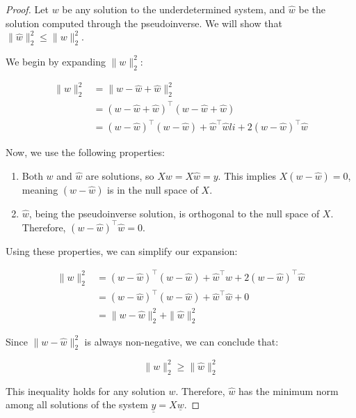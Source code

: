 \begin{proof}
Let $w$ be any solution to the underdetermined system, and $\hat{w}$ be the solution computed through the pseudoinverse. We will show that $\|\hat{w}\|_2^2 \leq \|w\|_2^2$.

We begin by expanding $\|w\|_2^2$:

\begin{align*}
\|w\|_2^2 &= \|w-\hat{w}+\hat{w}\|_2^2 \\
&= (w-\hat{w}+\hat{w})^{\top}(w-\hat{w}+\hat{w}) \\
&= (w-\hat{w})^{\top}(w-\hat{w}) + \hat{w}^{\top}\hat{w}li + 2(w-\hat{w})^{\top}\hat{w}
\end{align*}

Now, we use the following properties:

\begin{enumerate}
\item Both $w$ and $\hat{w}$ are solutions, so $Xw = X\hat{w} = y$. This implies $X(w - \hat{w}) = 0$, meaning $(w - \hat{w})$ is in the null space of $X$.\\

\item $\hat{w}$, being the pseudoinverse solution, is orthogonal to the null space of $X$. Therefore, $(w - \hat{w})^{\top}\hat{w} = 0$.\\
\end{enumerate}

Using these properties, we can simplify our expansion:

\begin{align*}
\|w\|_2^2 &= (w-\hat{w})^{\top}(w-\hat{w}) + \hat{w}^{\top}w + 2(w-\hat{w})^{\top}\hat{w} \\
&= (w-\hat{w})^{\top}(w-\hat{w}) + \hat{w}^{\top}\hat{w} + 0 \\
&= \|w-\hat{w}\|_2^2 + \|\hat{w}\|_2^2
\end{align*}

Since $\|w-\hat{w}\|_2^2$ is always non-negative, we can conclude that:

\begin{equation*}
\|w\|_2^2 \geq \|\hat{w}\|_2^2
\end{equation*}

This inequality holds for any solution $w$. Therefore, $\hat{w}$ has the minimum norm among all solutions of the system $\underline{y} = X\underline{w}$.
\end{proof}

\newpage

